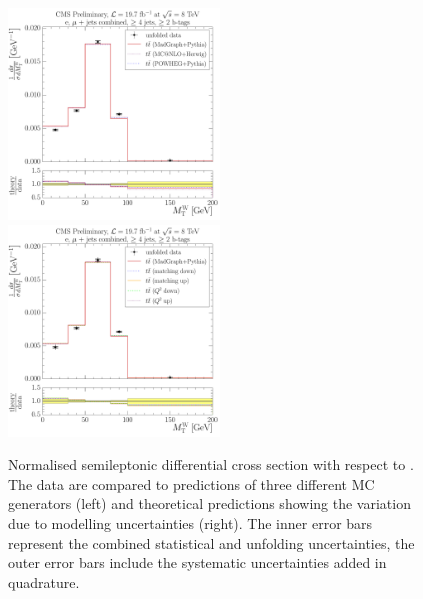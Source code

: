 \begin{figure}[!htbp]
	\centering
  	{\includegraphics[width=0.5\textwidth]{measurement/MT/central/normalised_xsection_combined_different_generators}}\hfill
  	{\includegraphics[width=0.5\textwidth]{measurement/MT/central/normalised_xsection_combined_systematics_shifts}}
    \caption[Normalised semileptonic \ttbar differential cross section with respect to \MT]{Normalised semileptonic
      \ttbar differential cross section with respect to \MT. The data are compared to predictions of three different MC
      generators (left) and theoretical predictions showing the variation due to modelling uncertainties (right). The
      inner error bars represent the combined statistical and unfolding uncertainties, the outer error bars include the
      systematic uncertainties added in quadrature.}
    \label{fig:results_MT_combined}
\end{figure}

